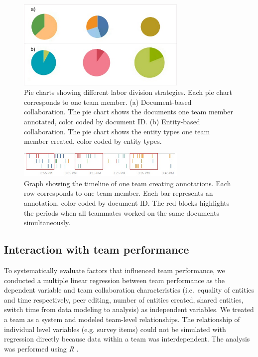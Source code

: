 \begin{figure}
\centering
\includegraphics[width=3.20000in]{img/labor_division.jpg}
\caption{Pie charts showing different labor division strategies. Each
pie chart corresponds to one team member. (a) Document-based
collaboration. The pie chart shows the documents one team member
annotated, color coded by document ID. (b) Entity-based collaboration.
The pie chart shows the entity types one team member created, color
coded by entity types.\label{fig:labor_division}}
\end{figure}

\begin{figure}
\centering
\includegraphics[width=3.20000in]{img/close_collaboration.jpg}
\caption{Graph showing the timeline of one team creating annotations.
Each row corresponds to one team member. Each bar represents an
annotation, color coded by document ID. The red blocks highlights the
periods when all teammates worked on the same documents
simultaneously.\label{fig:close_collaboration}}
\end{figure}

\subsection{Interaction with team performance}

To systematically evaluate factors that influenced team performance,
we conducted a multiple linear regression between team performance
as the dependent variable and team collaboration characteristics
(i.e.~equality of entities and time respectively, peer editing, number of entities created, shared
entities, switch time from data modeling to analysis) as independent
variables. We treated a team as a system \cite{Henman2003b} and modeled team-level
relationships.
The relationship of individual level variables (e.g.
survey items) could not be simulated with regression directly because data within a team was interdependent. The analysis was performed using \emph{R} \cite{R2016}.

